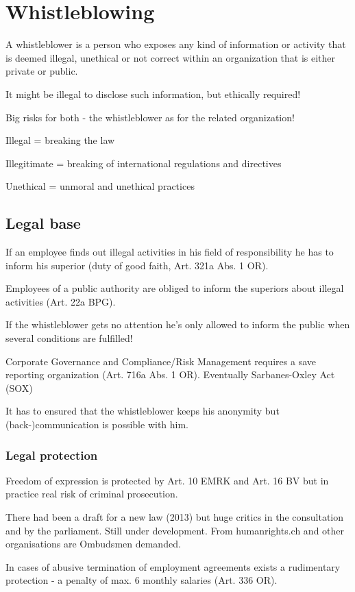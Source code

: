 \section{Whistleblowing}
A whistleblower is a person who exposes any kind of information or activity that is deemed illegal, unethical or not correct within an organization that is either private or public.
\begin{compactitem}
	\item It might be illegal to disclose such information, but ethically required!
	\item Big risks for both - the whistleblower as for the related organization!
	\item Illegal = breaking the law
	\item Illegitimate = breaking of international regulations and directives
	\item Unethical = unmoral and unethical practices
\end{compactitem}

\subsection{Legal base}
\begin{compactitem}
	\item If an employee finds out illegal activities in his field of responsibility he has to inform his superior (duty of good faith, Art. 321a Abs. 1 OR).
	\item Employees of a public authority are obliged to inform the superiors about illegal	activities (Art. 22a BPG).
	\item If the whistleblower gets no attention he’s only allowed to inform the public when several conditions are fulfilled!
	\item Corporate Governance and Compliance/Risk Management requires a save reporting	organization (Art. 716a Abs. 1 OR). Eventually Sarbanes-Oxley Act (SOX)
	\item It has to ensured that the whistleblower keeps his anonymity but (back-)communication	is possible with him.
\end{compactitem}

\subsubsection{Legal protection}
\begin{compactitem}
	\item Freedom of expression is protected by Art. 10 EMRK and Art. 16 BV but in practice real risk of criminal prosecution.
	\item There had been a draft for a new law (2013) but huge critics in the consultation and by the parliament. Still under development. From	humanrights.ch and other organisations are Ombudsmen demanded.
	\item In cases of abusive termination of employment agreements exists a	rudimentary protection - a penalty of max. 6 monthly salaries (Art. 336 OR).
\end{compactitem}

